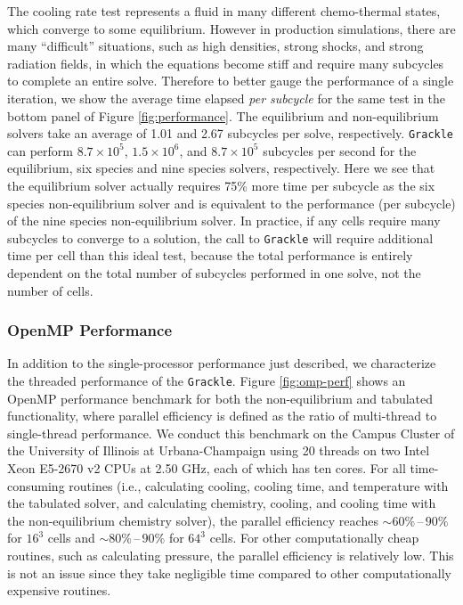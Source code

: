 The cooling rate test represents a fluid in many different
chemo-thermal states, which converge to some equilibrium.  However in
production simulations, there are many ``difficult'' situations, such
as high densities, strong shocks, and strong radiation fields, in
which the equations become stiff and require many subcycles to
complete an entire solve.  Therefore to better gauge the performance
of a single iteration, we show the average time elapsed {\it per
  subcycle} for the same test in the bottom panel of Figure
\ref{fig:performance}.  The equilibrium and non-equilibrium solvers
take an average of 1.01 and 2.67 subcycles per solve, respectively.
\texttt{Grackle} can perform $8.7 \times 10^5$, $1.5 \times 10^6$, and $8.7
\times 10^5$ subcycles per second for the equilibrium, six species and
nine species solvers, respectively.  Here we see that the equilibrium
solver actually requires 75\% more time per subcycle as the six species
non-equilibrium solver and is equivalent to the performance (per
subcycle) of the nine species non-equilibrium solver.  In practice, if
any cells require many subcycles to converge to a solution, the call
to \texttt{Grackle} will require additional time per cell than this ideal test,
because the total performance is entirely dependent on the total
number of subcycles performed in one solve, not the number of cells.

\subsubsection{OpenMP Performance}

In addition to the single-processor performance just described, we
characterize the threaded performance of the \texttt{Grackle}.
Figure \ref{fig:omp-perf} shows an OpenMP performance benchmark for both the
non-equilibrium and tabulated functionality, where parallel efficiency is
defined as the ratio of multi-thread to single-thread performance. We
conduct this benchmark on the Campus Cluster of the University of Illinois
at Urbana-Champaign using 20 threads on two Intel Xeon E5-2670 v2 CPUs
at 2.50 GHz, each of which has ten cores. For all time-consuming routines
(i.e., calculating cooling, cooling time, and temperature with the tabulated
solver, and calculating chemistry, cooling, and cooling time with the
non-equilibrium chemistry solver), the parallel efficiency reaches
$\sim 60\%\,\text{--}\,90\%$ for $16^3$ cells and
$\sim 80\%\,\text{--}\,90\%$ for $64^3$ cells. For other computationally cheap
routines, such as calculating pressure, the parallel efficiency is relatively
low. This is not an issue since they take negligible time compared to other
computationally expensive routines.

